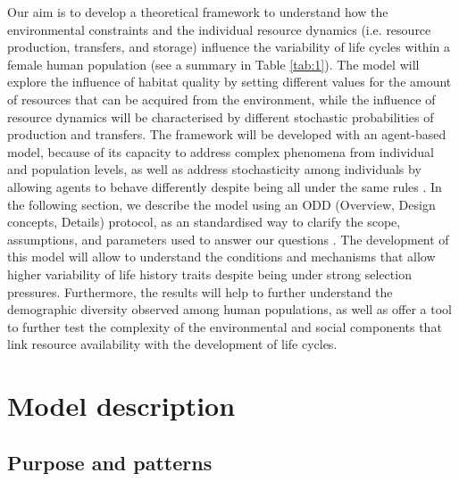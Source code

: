 \documentclass{article}
\begin{document}
Our aim is to develop a theoretical framework to understand how the environmental constraints and the individual resource dynamics (i.e. resource production, transfers, and storage) influence the variability of life cycles within a female human population (see a summary in Table \ref{tab:1}). The model will explore the influence of habitat quality by setting different values for the amount of resources that can be acquired from the environment, while the influence of resource dynamics will be characterised by different stochastic probabilities of production and transfers. The framework will be developed with an agent-based model, because of its capacity to address complex phenomena from individual and population levels, as well as address stochasticity among individuals by allowing agents to behave differently despite being all under the same rules \citep{judson1994rise,wilensky2015introduction}. In the following section, we describe the model using an ODD (Overview, Design concepts, Details) protocol, as an standardised way to clarify the scope, assumptions, and parameters used to answer our questions \citep{grimm2006standard,grimm2020odd}. The development of this model will allow to understand the conditions and mechanisms that allow higher variability of life history traits despite being under strong selection pressures. Furthermore, the results will help to further understand the demographic diversity observed among human populations, as well as offer a tool to further test the complexity of the environmental and social components that link resource availability with the development of life cycles.

\section{Model description}

\subsection{Purpose and patterns}
\end{document}
